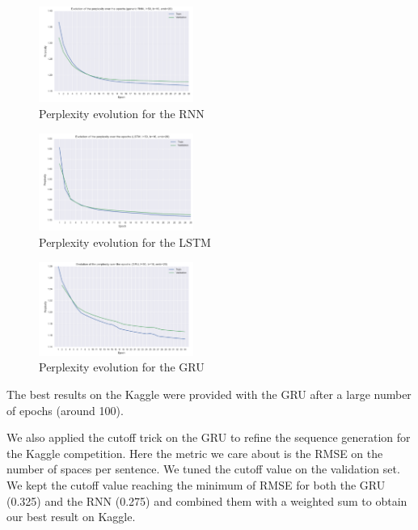 \documentclass[11pt]{article}
\begin{document}
\begin{figure}[H]
\begin{center}
    \includegraphics[width=0.45\textwidth]{perp_rnn.png}
    \caption{Perplexity evolution for the RNN}
\end{center}
\end{figure}

\begin{figure}[H]
\begin{center}
    \includegraphics[width=0.45\textwidth]{perp_lstm.png}
    \caption{Perplexity evolution for the LSTM}
\end{center}
\end{figure}

\begin{figure}[H]
\begin{center}
    \includegraphics[width=0.45\textwidth]{perp_gru.png}
    \caption{Perplexity evolution for the GRU}
\end{center}
\end{figure}

The best results on the Kaggle were provided with the GRU after a large number of epochs (around 100).

We also applied the cutoff trick on the GRU to refine the sequence generation for the Kaggle competition. Here the metric we care about is the RMSE on the number of spaces per sentence. We tuned the cutoff value on the validation set. We kept the cutoff value reaching the minimum of RMSE for both the GRU (0.325) and the RNN (0.275) and combined them with a weighted sum to obtain our best result on Kaggle.
\end{document}
